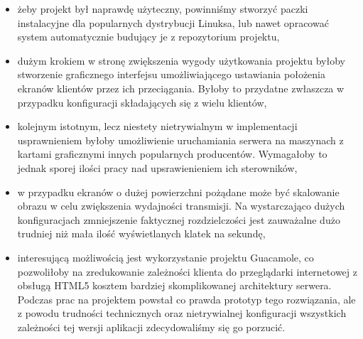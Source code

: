     \begin{itemize}

      \item żeby projekt był naprawdę użyteczny, powinniśmy stworzyć paczki instalacyjne dla popularnych dystrybucji Linuksa, lub nawet opracować system automatycznie budujący je z repozytorium projektu,

      \item dużym krokiem w stronę zwiększenia wygody użytkowania projektu byłoby stworzenie graficznego interfejsu umożliwiającego ustawiania położenia ekranów klientów przez ich przeciągania. Byłoby to przydatne zwłaszcza w przypadku konfiguracji składających się z wielu klientów,

      \item kolejnym istotnym, lecz niestety nietrywialnym w implementacji usprawnieniem byłoby umożliwienie uruchamiania serwera na maszynach z kartami graficznymi innych popularnych producentów. Wymagałoby to jednak sporej ilości pracy nad upsrawienieniem ich sterowników,

      \item w przypadku ekranów o dużej powierzchni pożądane może być skalowanie obrazu w celu zwiększenia wydajności transmisji. Na wystarczająco dużych konfiguracjach zmniejszenie faktycznej rozdzielczości jest zauważalne dużo trudniej niż mała ilość wyświetlanych klatek na sekundę,

      \item interesującą możliwością jest wykorzystanie projektu Guacamole, co pozwoliłoby na zredukowanie zależności klienta do przeglądarki internetowej z obsługą HTML5 kosztem bardziej skomplikowanej architektury serwera. Podczas prac na projektem powstał co prawda prototyp tego rozwiązania, ale z powodu trudności technicznych oraz nietrywialnej konfiguracji wszystkich zależności tej wersji aplikacji zdecydowaliśmy się go porzucić.

    \end{itemize}

    \vfill

